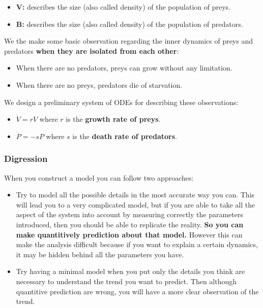 \begin{itemize}
    \item \textbf{V:} describes the size (also called density) of the population of preys.
    \item \textbf{B:} describes the size (also called density) of the population of predators.
\end{itemize}

We the make some basic observation regarding the inner dynamics of preys and predators \textbf{when they are isolated from each other}:

\begin{itemize}
    \item When there are no predators, preys can grow without any limitation.
    \item When there are no preys, predators die of starvation.
\end{itemize}

We design a preliminary system of ODEs for describing these observations:

\begin{itemize}
    \item $\dot{V} = rV$ where $r$ is the \textbf{growth rate of preys}.
    \item $\dot{P} = - sP$ where $s$ is the \textbf{death rate of predators}.
\end{itemize}

\subsubsection{Digression}
When you construct a model you can follow two approaches:
\begin{itemize}
    \item Try to model all the possible details in the most accurate way you can. This will lead you to a very complicated model, but if you are able to take all the aspect of the system into account by measuring correctly the parameters introduced, then you should be able to replicate the reality. \textbf{So you can make quantitively prediction about that model.} However this can make the analysis difficult because if you want to explain a certain dynamics, it may be hidden behind all the parameters you have.

    \item Try having a minimal model when you put only the details you think are necessary to understand the trend you want to predict. Then although quantitive prediction are wrong, you will have a more clear observation of the trend.
\end{itemize}

